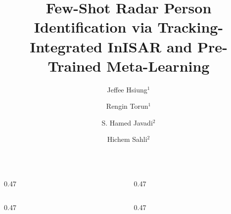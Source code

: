 \documentclass[english, xcolor=table]{beamer}
\title{Few-Shot Radar Person Identification via 
Tracking-Integrated InISAR and Pre-Trained Meta-Learning}
\author{Jeffee Hsiung$^{1}$ \and Rengin Torun$^{1}$ \and S. Hamed Javadi$^{2}$ \and Hichem Sahli$^{2}$}
\institute{$^{1}$KU Leuven, $^{2}$Other University}
\begin{document}
\begin{frame}[t]
\vspace{0.35cm}

  \begin{columns}[t,totalwidth=0.95\paperwidth]
    \begin{column}{0.47\paperwidth}
      
      
      
    \end{column}
    \begin{column}{0.47\paperwidth}
      
      
    \end{column}
  \end{columns}

  \vspace{0.2cm}

  \begin{columns}[t,totalwidth=0.95\paperwidth]
    \begin{column}{0.47\paperwidth}
          
    \end{column}
    \begin{column}{0.47\paperwidth}
      
    \end{column}
  \end{columns}

\end{frame}
\end{document}
